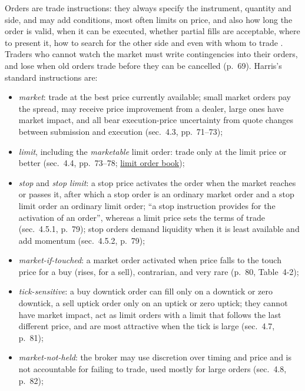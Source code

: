 \begin{qfdefinition}\label{def:order-instructions}
 Orders are trade instructions: they always specify the instrument, quantity and side, and may add conditions, most often limits on price, and also how long the order is valid, when it can be executed, whether partial fills are acceptable, where to present it, how to search for the other side and even with whom to trade \citep[chap.~4, sec.~4.1, pp.~68--69]{alpha-harris}. Traders who cannot watch the market must write contingencies into their orders, and lose when old orders trade before they can be cancelled (p.~69). Harris's standard instructions are:
\begin{itemize}
\item \emph{market}: trade at the best price currently available; small market orders pay the spread, may receive price improvement from a dealer, large ones have market impact, and all bear execution-price uncertainty from quote changes between submission and execution (sec.~4.3, pp.~71--73);
\item \emph{limit}, including the \emph{marketable} limit order: trade only at the limit price or better (sec.~4.4, pp.~73--78; \hyperref[def:limit-order-book]{limit order book});
\item \emph{stop} and \emph{stop limit}: a stop price activates the order when the market reaches or passes it, after which a stop order is an ordinary market order and a stop limit order an ordinary limit order; ``a stop instruction provides for the activation of an order'', whereas a limit price sets the terms of trade (sec.~4.5.1, p.~79); stop orders demand liquidity when it is least available and add momentum (sec.~4.5.2, p.~79);
\item \emph{market-if-touched}: a market order activated when price falls to the touch price for a buy (rises, for a sell), contrarian, and very rare (p.~80, Table~4-2);
\item \emph{tick-sensitive}: a buy downtick order can fill only on a downtick or zero downtick, a sell uptick order only on an uptick or zero uptick; they cannot have market impact, act as limit orders with a limit that follows the last different price, and are most attractive when the tick is large (sec.~4.7, p.~81);
\item \emph{market-not-held}: the broker may use discretion over timing and price and is not accountable for failing to trade, used mostly for large orders (sec.~4.8, p.~82);

\end{itemize}
\end{qfdefinition}
